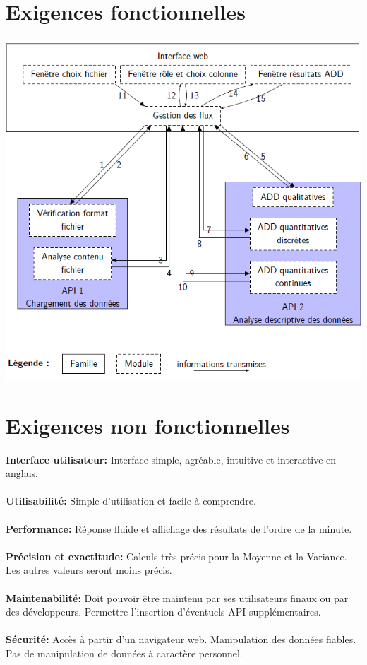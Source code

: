 	\section{Exigences fonctionnelles}
	\begin{frame}
		\begin{center}\includegraphics[scale=0.43]{org.png}\end{center}
	\end{frame}
	
	\section{Exigences non fonctionnelles}
	\begin{frame}
		\textbf{Interface utilisateur:} Interface simple, agréable, intuitive et interactive en anglais.\\~\\ 
		\pause
		\textbf{Utilisabilité:} Simple d'utilisation et facile à comprendre.\\~\\
		\pause
		\textbf{Performance:} Réponse fluide et affichage des résultats de l'ordre de la minute.\\~\\
		\pause
		\textbf{Précision et exactitude:} Calculs très précis pour la Moyenne et la Variance. Les autres valeurs seront moins précis.\\~\\
		\pause
		\textbf{Maintenabilité:} Doit pouvoir être maintenu par ses utilisateurs finaux ou par des développeurs. Permettre l'insertion d'éventuels API supplémentaires.\\~\\
		\pause
		\textbf{Sécurité:} Accès à partir d'un navigateur web. Manipulation des données fiables. Pas de manipulation de données à caractère personnel.\\
	\end{frame}
	

